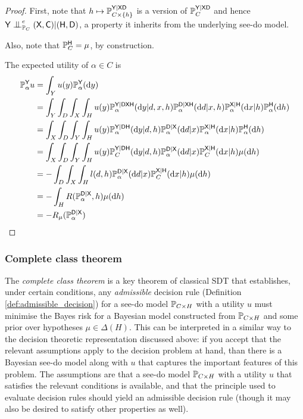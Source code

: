 \begin{proof}
First, note that $h\mapsto \mathbb{P}_{C\times \{h\}}^{\mathsf{Y}|\mathsf{XD}}$ is a version of $\mathbb{P}_C^{\mathsf{Y}|\mathsf{XD}}$ and hence $\RV{Y}\CI^e_{\prob{P}_C} (\RV{X},\RV{C})|(\RV{H},\RV{D})$, a property it inherits from the underlying see-do model.

Also, note that $\mathbb{P}_C^{\mathsf{H}}=\mu$, by construction.

The expected utility of $\alpha\in C$ is 
\begin{align}
    \mathbb{P}_\alpha^{\mathsf{Y}} u &= \int_Y u(y) \mathbb{P}_{\alpha}^{\mathsf{Y}}(\mathrm{d}y) \\
    &= \int_Y  \int_D \int_{X} \int_H u(y)\mathbb{P}_{\alpha}^{\mathsf{Y}|\mathsf{DXH}}(\mathrm{d}y|d,x,h)\mathbb{P}_{\alpha}^{\mathsf{D}|\mathsf{XH}}(\mathrm{d}d|x,h)\mathbb{P}_{\alpha}^{\mathsf{X}|\mathsf{H}}(\mathrm{d}x|h)\mathbb{P}_\alpha^{\mathsf{H}}(\mathrm{d}h) \\
    &= \int_X  \int_D \int_{Y} \int_H u(y) \mathbb{P}_{\alpha}^{\mathsf{Y}|\mathsf{DH}}(\mathrm{d}y|d,h)\mathbb{P}_{\alpha}^{\mathsf{D}|\mathsf{X}}(\mathrm{d}d|x)\mathbb{P}_{\alpha}^{\mathsf{X}|\mathsf{H}}(\mathrm{d}x|h)\mathbb{P}_\alpha^{\mathsf{H}}(\mathrm{d}h)\\
    &=  \int_X  \int_D \int_{Y} \int_H u(y) \mathbb{P}_{C}^{\mathsf{Y}|\mathsf{DH}}(\mathrm{d}y|d,h)\mathbb{P}_{\alpha}^{\mathsf{D}|\mathsf{X}}(\mathrm{d}d|x)\mathbb{P}_{C}^{\mathsf{X}|\mathsf{H}}(\mathrm{d}x|h)\mu(\mathrm{d}h)\\
     &= -\int_D\int_X\int_H l(d,h)\mathbb{P}_{\alpha}^{\mathsf{D}|\mathsf{X}}(\mathrm{d}d|x)\mathbb{P}_{C}^{\mathsf{X}|\mathsf{H}}(\mathrm{d}x|h)\mu(\mathrm{d}h)\\
    &= -\int_H R(\mathbb{P}_{\alpha}^{\mathsf{D}|\mathsf{X}},h)\mu(\mathrm{d}h)\\
    &= -R_{\mu}(\mathbb{P}_{\alpha}^{\mathsf{D}|\mathsf{X}})
\end{align}
\end{proof}

\subsubsection{Complete class theorem}\label{sec:cc_theorem}

The \emph{complete class theorem} is a key theorem of classical SDT that establishes, under certain conditions, any \emph{admissible} decision rule (Definition \ref{def:admissible_decision}) for a see-do model $\mathbb{P}_{C\times H}$ with a utility $u$ must minimise the Bayes risk for a Bayesian model constructed from $\mathbb{P}_{C\times H}$ and some prior over hypotheses $\mu\in \Delta(H)$. This can be interpreted in a similar way to the decision theoretic representation discussed above: if you accept that the relevant assumptions apply to the decision problem at hand, than there is a Bayesian see-do model along with $u$ that captures the important features of this problem. The assumptions are that a see-do model $\mathbb{P}_{C\times H}$ with a utility $u$ that satisfies the relevant conditions is available, and that the principle used to evaluate decision rules should yield an admissible decision rule (though it may also be desired to satisfy other properties as well).

